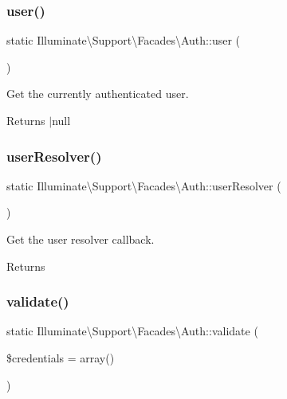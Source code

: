 \subsubsection{\texorpdfstring{user()}{user()}}
{\footnotesize\ttfamily static Illuminate\textbackslash{}\+Support\textbackslash{}\+Facades\textbackslash{}\+Auth\+::user (\begin{DoxyParamCaption}{ }\end{DoxyParamCaption})\hspace{0.3cm}{\ttfamily [static]}}

Get the currently authenticated user.

\begin{DoxyReturn}{Returns}
$\vert$null 
\end{DoxyReturn}
\mbox{\label{class_illuminate_1_1_support_1_1_facades_1_1_auth_ab6601a8ada37b3aaaab8700de51eb523}} 
\subsubsection{\texorpdfstring{user\+Resolver()}{userResolver()}}
{\footnotesize\ttfamily static Illuminate\textbackslash{}\+Support\textbackslash{}\+Facades\textbackslash{}\+Auth\+::user\+Resolver (\begin{DoxyParamCaption}{ }\end{DoxyParamCaption})\hspace{0.3cm}{\ttfamily [static]}}

Get the user resolver callback.

\begin{DoxyReturn}{Returns}

\end{DoxyReturn}
\mbox{\label{class_illuminate_1_1_support_1_1_facades_1_1_auth_a3bae01dfeecf84ab4ab06d46ae4214f7}} 
\subsubsection{\texorpdfstring{validate()}{validate()}}
{\footnotesize\ttfamily static Illuminate\textbackslash{}\+Support\textbackslash{}\+Facades\textbackslash{}\+Auth\+::validate (\begin{DoxyParamCaption}\item[{}]{\$credentials = {\ttfamily array()} }\end{DoxyParamCaption})\hspace{0.3cm}{\ttfamily [static]}}

